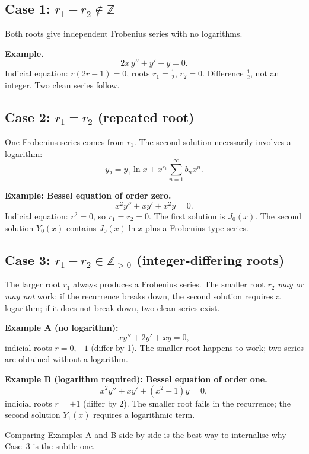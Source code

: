 \documentclass{essay}
\begin{document}
\subsection*{Case 1: \(r_{1} - r_{2} \notin \mathbb{Z}\)}

Both roots give independent Frobenius series with no logarithms.

\textbf{Example.}
\[ 2x\,y'' + y' + y = 0. \]
Indicial equation: \(r(2r-1) = 0\), roots \(r_{1} = \tfrac{1}{2}\), \(r_{2} = 0\).  Difference \(\tfrac{1}{2}\), not an integer.  Two clean series follow.

\subsection*{Case 2: \(r_{1} = r_{2}\) (repeated root)}

One Frobenius series comes from \(r_{1}\).  The second solution necessarily involves a logarithm:
\[ y_{2} = y_{1} \ln x + x^{r_{1}}\sum_{n=1}^{\infty} b_{n} x^{n}. \]

\textbf{Example: Bessel equation of order zero.}
\[ x^{2} y'' + xy' + x^{2} y = 0. \]
Indicial equation: \(r^{2} = 0\), so \(r_{1} = r_{2} = 0\).  The first solution is \(J_{0}(x)\).  The second solution \(Y_{0}(x)\) contains \(J_{0}(x)\ln x\) plus a Frobenius-type series.

\subsection*{Case 3: \(r_{1} - r_{2} \in \mathbb{Z}_{>0}\) (integer-differing roots)}

The larger root \(r_{1}\) always produces a Frobenius series.  The smaller root \(r_{2}\) \emph{may or may not} work: if the recurrence breaks down, the second solution requires a logarithm; if it does not break down, two clean series exist.

\medskip
\noindent\textbf{Example A (no logarithm):}
\[ xy'' + 2y' + xy = 0, \]
indicial roots \(r = 0, -1\) (differ by 1).  The smaller root happens to work; two series are obtained without a logarithm.

\medskip
\noindent\textbf{Example B (logarithm required): Bessel equation of order one.}
\[ x^{2} y'' + xy' + (x^{2} - 1)y = 0, \]
indicial roots \(r = \pm 1\) (differ by 2).  The smaller root fails in the recurrence; the second solution \(Y_{1}(x)\) requires a logarithmic term.

\medskip
Comparing Examples A and B side-by-side is the best way to internalise why Case~3 is the subtle one.
\end{document}
